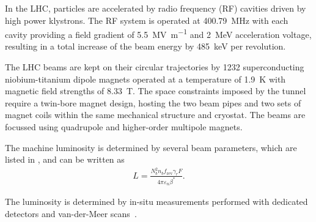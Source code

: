 In the LHC, particles are accelerated by radio frequency (RF) cavities driven by high power klystrons. The RF system is operated at \SI{400.79}{\mega\hertz} with each cavity providing a field gradient of \SI{5.5}{\mega\volt\per\meter} and \SI{2}{\mega\electronvolt} acceleration voltage, resulting in a total increase of the beam energy by \SI{485}{\kilo\electronvolt} per revolution.

The LHC beams are kept on their circular trajectories by \num{1232} superconducting niobium-titanium dipole magnets operated at a temperature of \SI{1.9}{\kelvin} with magnetic field strengths of \SI{8.33}{\tesla}. The space constraints imposed by the tunnel require a twin-bore magnet design, hosting the two beam pipes and two sets of magnet coils within the same mechanical structure and cryostat. The beams are focussed using quadrupole and higher-order multipole magnets.

The machine luminosity is determined by several beam parameters, which are listed in , and can be written as
\begin{align}
    L = \frac{N_{b}^2 n_b f_{\text{rev}} \gamma_r F}{4 \pi \varepsilon_n \beta^{*}}.
\end{align}

The luminosity is determined by in-situ measurements performed with dedicated detectors and van-der-Meer scans~\cite{vanderMeer:296752,ATLAS-CONF-2019-021}.

\begin{table}
\caption{Essential LHC parameters with their description and values during Run-2 operation~\cite{Evans2008}.}
\label{tab:lhcparameters}
\end{table}

